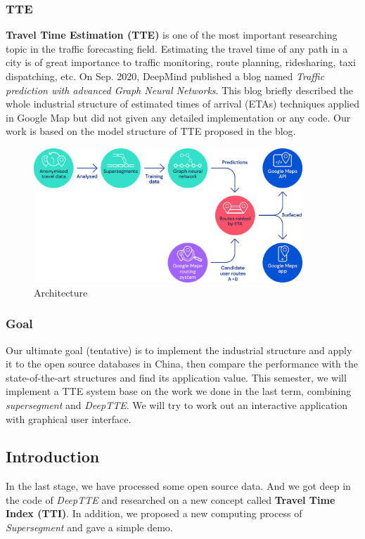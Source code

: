 \documentclass[fontset=none]{ctexart}
\theoremstyle{definition}
\theoremstyle{remark}
\begin{document}
\subsubsection{TTE}
\textbf{Travel Time Estimation (TTE)} is one of the most important researching topic in the traffic forecasting field. 
Estimating the travel time of any path in a city is of great importance to traffic monitoring, route planning, ridesharing, taxi dispatching, etc.
On Sep. 2020, DeepMind published a blog named \textit{Traffic prediction with advanced Graph Neural Networks}. 
This blog briefly described the whole industrial structure of estimated times of arrival (ETAs) techniques applied in Google Map but did not given any detailed implementation or any code.
Our work is based on the model structure of TTE proposed in the blog.
\begin{figure}[htb]
    \centering
    \includegraphics[width=0.9\textwidth]{images/architecture.png}
    \caption{Architecture}
    \label{fig1}
\end{figure}

\subsubsection{Goal}
Our ultimate goal (tentative) is to implement the industrial structure and apply it to the open source databases in China, then compare the performance with the state-of-the-art structures and find its application value.
This semester, we will implement a TTE system base on the work we done in the last term, combining \textit{supersegment} and \textit{DeepTTE}.
We will try to work out an interactive application with graphical user interface. 

\subsection{Introduction}
In the last stage, we have processed some open source data. And we got deep in the code of \textit{DeepTTE} and researched on a new concept
called \textbf{Travel Time Index (TTI)}. In addition, we proposed a new computing process of \textit{Supersegment} and gave a simple demo.
\end{document}
